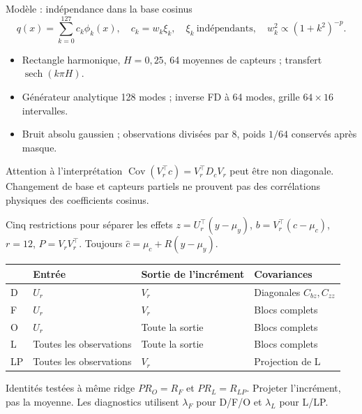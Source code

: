 \documentclass[aspectratio=169,10pt]{beamer}
\begin{document}
\begin{frame}{Modèle : indépendance dans la base cosinus}
\[
q(x)=\sum_{k=0}^{127}c_k\phi_k(x),\quad c_k=w_k\xi_k,\quad
\xi_k\ \text{indépendants},\quad w_k^2\propto(1+k^2)^{-p}.
\]
\begin{itemize}
\item Rectangle harmonique, $H=0,25$, 64 moyennes de capteurs ; transfert $\operatorname{sech}(k\pi H)$.
\item Générateur analytique 128 modes ; inverse FD à 64 modes, grille $64\times16$ intervalles.
\item Bruit absolu gaussien ; observations divisées par 8, poids $1/64$ conservés après masque.
\end{itemize}
\begin{block}{Attention à l'interprétation}
$\operatorname{Cov}(V_r^\top c)=V_r^\top D_cV_r$ peut être non diagonale. Changement de base et capteurs partiels ne prouvent pas des corrélations physiques des coefficients cosinus.
\end{block}
\end{frame}

\begin{frame}{Cinq restrictions pour séparer les effets}
\small $z=U_r^\top(y-\mu_y)$, $b=V_r^\top(c-\mu_c)$, $r=12$, $P=V_rV_r^\top$. Toujours $\widehat c=\mu_c+R(y-\mu_y)$.
\par\vspace{3mm}
\begin{center}
\begin{tabular}{llll}
\toprule & Entrée & Sortie de l'incrément & Covariances\\\midrule
D & $U_r$ & $V_r$ & Diagonales $C_{bz},C_{zz}$\\
F & $U_r$ & $V_r$ & Blocs complets\\
O & $U_r$ & Toute la sortie & Blocs complets\\
L & Toutes les observations & Toute la sortie & Blocs complets\\
LP & Toutes les observations & $V_r$ & Projection de L\\\bottomrule
\end{tabular}
\end{center}
\par\vspace{3mm}
\begin{block}{Identités testées à même ridge}
$PR_O=R_F$ et $PR_L=R_{LP}$. Projeter l'incrément, pas la moyenne. Les diagnostics utilisent $\lambda_F$ pour D/F/O et $\lambda_L$ pour L/LP.
\end{block}
\end{frame}
\end{document}
